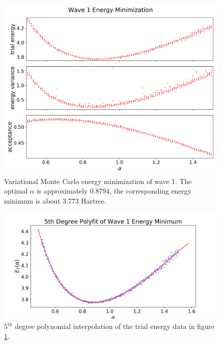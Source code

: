 \documentclass[nofootinbib,reprint,english]{revtex4-1}
\begin{document}
\begin{figure}[h!]
\centering
\includegraphics[scale=0.34]{../results/wave1/energy_minimization_2_edited.png}
\caption{Variational Monte Carlo energy minimization of wave 1. The optimal \(\alpha\) is approximately 0.8794, the corresponding energy minimum is about 3.773 Hartree.}\label{fig:wave1_optimization}
\end{figure}

\begin{figure}[h!]
\centering
\includegraphics[scale=0.34]{../results/wave1/energy_minimum_deg5polyfit_2.png}
\caption{\(5^\text{th}\) degree polynomial interpolation of the trial energy data in figure \ref{fig:wave1_optimization}.}\label{fig:wave1_polyfit}
\end{figure}
\end{document}
